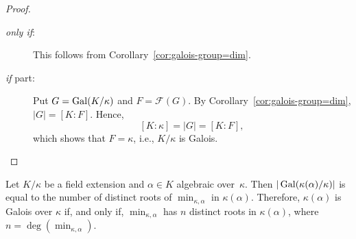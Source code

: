 \begin{proof}${}$
    \begin{description}
        \item[\rm\textit{only if\/}:] This follows from Corollary~\ref{cor:galois-group=dim}.
        
        \item[\rm\textit{if\/} part:] Put $G=\operatorname{Gal}(K/\kappa)$ and $F=\mathcal F(G)$. By Corollary~\ref{cor:galois-group=dim}, $|G|=[K:F]$. Hence,
        $$
            [K:\kappa] =|G|=[K:F],
        $$
        which shows that $F=\kappa$, i.e., $K/\kappa$ is Galois.
    \end{description}
\end{proof}

\begin{cor}\label{cor:galois-group-order-and-min-deg}
    Let\/ $K/\kappa$ be a field extension and\/ $\alpha \in K$ algebraic over\/~$\kappa$. Then\/ $|\operatorname{Gal}(\kappa(\alpha)/\kappa)|$ is equal to the number of distinct roots of\/ $\min_{\kappa, \alpha}$ in\/ $\kappa(\alpha)$. Therefore, $\kappa(\alpha)$ is Galois over\/ $\kappa$ if, and only if, $\min_{\kappa,\alpha}$ has\/ $n$ distinct roots in\/ $\kappa(\alpha)$, where\/ $n = \deg(\min_{\kappa, \alpha})$.
\end{cor}


